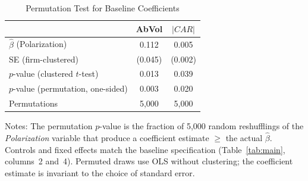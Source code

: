 \begin{table}[htbp]
\centering
\caption{Permutation Test for Baseline Coefficients}
\label{tab:permutation}
\begin{tabular}{lcc}
\toprule
 & AbVol & $|CAR|$ \\
\midrule
$\hat{\beta}$ (Polarization) & 0.112 & 0.005 \\
SE (firm-clustered) & (0.045) & (0.002) \\
$p$-value (clustered $t$-test) & 0.013 & 0.039 \\
$p$-value (permutation, one-sided) & 0.003 & 0.020 \\
Permutations & 5,000 & 5,000 \\
\bottomrule
\end{tabular}
\begin{flushleft}
\footnotesize Notes: The permutation $p$-value is the fraction of 5{,}000 random reshufflings of the \textit{Polarization} variable that produce a coefficient estimate $\geq$ the actual $\hat{\beta}$. Controls and fixed effects match the baseline specification (Table~\ref{tab:main}, columns~2 and~4). Permuted draws use OLS without clustering; the coefficient estimate is invariant to the choice of standard error.
\end{flushleft}
\end{table}